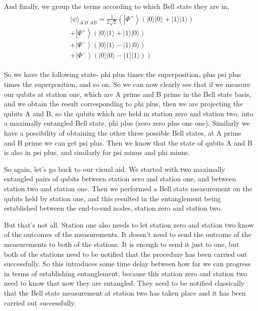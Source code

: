 And finally, we group the terms according to which Bell state they are in,
\begin{align}
\begin{aligned}
&|\psi\rangle_{A^{\prime} B^{\prime} A B}=\frac{1}{2 \sqrt{2}}\left(\left|\Phi^{+}\right\rangle(|0\rangle|0\rangle+|1\rangle|1\rangle)\right.\\
&+\left|\Psi^{+}\right\rangle(|0\rangle|1\rangle+|1\rangle|0\rangle)\\
&+\left|\Psi^{-}\right\rangle(|0\rangle|1\rangle-|1\rangle|0\rangle)\\
&\left.+\left|\Phi^{-}\right\rangle(|0\rangle|0\rangle-|1\rangle|1\rangle)\right)
\end{aligned}
\end{align}

So we have the following state- phi plus times the superposition, plus psi plus times the superposition, and so on. So we can now clearly see that if we measure our qubits at station one, which are A prime and B prime in the Bell state basis, and we obtain the result corresponding to phi plus, then we are projecting the qubits A and B, so the qubits which are held in station zero and station two, into a maximally entangled Bell state, phi plus (zero zero plus one one). Similarly we have a possibility of obtaining the other three possible Bell states, at A prime and B prime we can get psi plus. Then we know that the state of qubits A and B is also in psi plus, and similarly for psi minus and phi minus.

So again, let's go back to our visual aid. We started with two maximally entangled pairs of qubits between station zero and station one, and between station two and station one. Then we performed a Bell state measurement on the qubits held by station one, and this resulted in the entanglement being established between the end-to-end nodes, station zero and station two.

But that's not all. Station one also needs to let station zero and station two know of the outcomes of the measurements. It doesn't need to send the outcome of the measurements to both of the stations. It is enough to send it just to one, but both of the stations need to be notified that the procedure has been carried out successfully. So this introduces some time delay between how far we can progress in terms of establishing entanglement, because this station zero and station two need to know that now they are entangled. They need to be notified classically that the Bell state measurement at station two has taken place and it has been carried out successfully.

